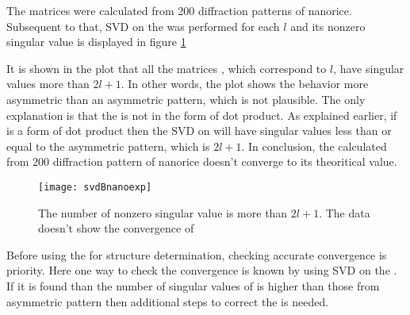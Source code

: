 The matrices \Blq were calculated from 200 diffraction patterns of nanorice. Subsequent to that, SVD on the \Blq was performed for each $l$ and its nonzero singular value is displayed in figure \ref{fig:svdnanoexp}

It is shown in the plot that all the matrices \Blq, which correspond to $l$, have singular values more than $2l+1$. In other words, the plot shows the behavior more asymmetric than an asymmetric pattern, which is not plausible. The only explanation is that the \Blq is not in the form of dot product. As explained earlier, if \Blq is a form of dot product then the SVD on \Blq will have singular values less than or equal to the asymmetric pattern, which is $2l+1$. In conclusion, the \Blq calculated from 200 diffraction pattern of nanorice doesn't converge to its theoritical value. 

\begin{figure}[h!]
  \centering
  \texttt{[image: svdBnanoexp]}
\caption{The number of nonzero singular value is more than $2 l+1$. The data doesn't show the convergence of \Blq}
\label{fig:svdnanoexp}
\end{figure}

Before using the \Blq for structure determination, checking accurate convergence is priority. Here one way to check the convergence is known by using SVD on the \Blq. If it is found than the number of singular values of \Blq is higher than those from asymmetric pattern then additional steps to correct the \Blq is needed. 

